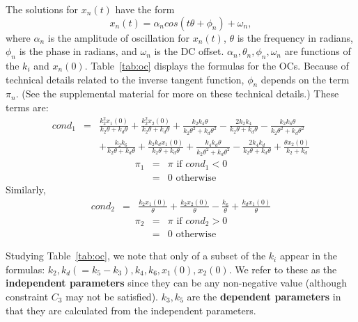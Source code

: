 \documentclass{bmcart}
\newcommand{\tab}[1]{Table~\ref{#1}}
\begin{document}
The solutions for $x_n(t)$ have the form
\begin{equation}
    x_n(t) = \alpha_n cos(t \theta  + \phi_n) + \omega_n,
\end{equation}
where $\alpha_n$ is the amplitude of oscillation for $x_n(t)$,
$\theta$ is the frequency in radians,
$\phi_n$ is the phase in radians, and
$\omega_n$ is the DC offset.
$\alpha_n, \theta_n, \phi_n, \omega_n$ are functions of the $k_i$ and $x_n (0)$.
\tab{tab:oc} displays the formulas for the OCs. Because of technical details related to the inverse tangent function, $\phi_n$ depends on the term $\pi_n$. (See the supplemental material for more on these technical details.)
These terms are:
\begin{eqnarray*}
cond_1 & = & 
\frac{k_{2}^{2} x_1 (0)}{k_{2} \theta + k_{d} \theta} + \frac{k_{2}^{2} x_2 (0)}{k_{2} \theta + k_{d} \theta} + \frac{k_{2} k_{4} \theta}{k_{2} \theta^{2} + k_{d} \theta^{2}} - \frac{2 k_{2} k_{4}}{k_{2} \theta + k_{d} \theta} 
- \frac{k_{2} k_{6} \theta}{k_{2} \theta^{2} + k_{d} \theta^{2}}  \\
& & 
+ \frac{k_{2} k_{6}}{k_{2} \theta + k_{d} \theta} + \frac{k_{2} k_{d} x_1 (0)}{k_{2} \theta + k_{d} \theta} + \frac{k_{4} k_{d} \theta}{k_{2} \theta^{2} + k_{d} \theta^{2}} - \frac{2 k_{4} k_{d}}{k_{2} \theta + k_{d} \theta} + \frac{\theta x_2 (0)}{k_{2} + k_{d}}
\end{eqnarray*}
\begin{eqnarray*}
\pi_1 & = & \pi \text{ if } cond_1 < 0 \\
& = & 0 \text { otherwise}
\end{eqnarray*}
Similarly,
\begin{eqnarray*}
cond_2 &  = &  \frac{k_{2} x_1 (0)}{\theta} + \frac{k_{2} x_2 (0)}{\theta} - \frac{k_{6}}{\theta} + \frac{k_{d} x_1 (0)}{\theta}
\end{eqnarray*}
\begin{eqnarray*}
\pi_2 & = & \pi \text{ if } cond_2 > 0 \\
& = & 0 \text { otherwise}
\end{eqnarray*}


Studying \tab{tab:oc}, we note that only of a subset of the $k_i$ appear in the formulas: $k_2, k_d (= k_5 - k_3), k_4, k_6, x_1(0), x_2(0).$
We refer to these as the {\bf independent parameters} since they can be any non-negative value (although constraint $C_3$ may not be satisfied).
$k_3, k_5$ are the {\bf dependent parameters} in that they are
calculated from the independent parameters.
\end{document}
